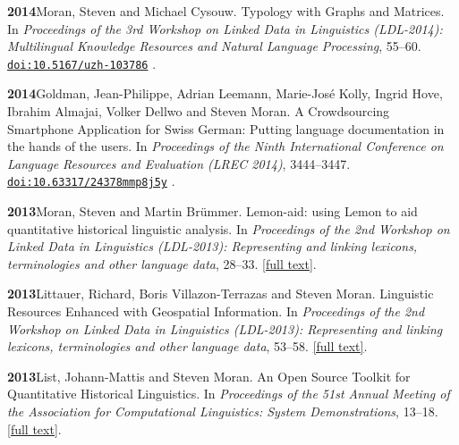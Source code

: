 \documentclass[11pt]{article}
\newcommand{\hangpara}{
 \setlength{\parindent}{0in} %
 \hangindent=0.42in %
}
\newcommand{\doi}[1]{%
  \href{https://doi.org/#1}{\nolinkurl{doi:#1}}%
}
\begin{document}
\vskip 6pt
\hangpara
{\bf 2014}\hspace{1ex}Moran, Steven and Michael Cysouw. Typology with Graphs and Matrices. In {\it Proceedings of the 3rd Workshop on Linked Data in Linguistics (LDL-2014): Multilingual Knowledge Resources and Natural Language Processing}, 55--60. \doi{10.5167/uzh-103786}.

\vskip 6pt
\hangpara
{\bf 2014}\hspace{1ex}Goldman, Jean-Philippe, Adrian Leemann, Marie-Jos{\'e} Kolly, Ingrid Hove, Ibrahim Almajai, Volker Dellwo and Steven Moran. A Crowdsourcing Smartphone Application for Swiss German: Putting language documentation in the hands of the users. In {\it Proceedings of the Ninth International Conference on Language Resources and Evaluation (LREC 2014)}, 3444--3447. \doi{10.63317/24378mmp8j5y}.

\vskip 6pt
\hangpara
{\bf 2013}\hspace{1ex}Moran, Steven and Martin Brümmer. Lemon-aid: using Lemon to aid quantitative historical linguistic analysis. In {\it Proceedings of the 2nd Workshop on Linked Data in Linguistics (LDL-2013): Representing and linking lexicons, terminologies and other language data}, 28--33. \href{https://aclanthology.org/W13-5505/}{[full text]}.

\vskip 6pt
\hangpara
{\bf 2013}\hspace{1ex}Littauer, Richard, Boris Villazon-Terrazas and Steven Moran. Linguistic Resources Enhanced with Geospatial Information. In {\it Proceedings of the 2nd Workshop on Linked Data in Linguistics (LDL-2013): Representing and linking lexicons, terminologies and other language data}, 53--58. \href{https://aclanthology.org/W13-5508/}{[full text]}.

\vskip 6pt
\hangpara
{\bf 2013}\hspace{1ex}List, Johann-Mattis and Steven Moran. An Open Source Toolkit for Quantitative Historical Linguistics. In {\it Proceedings of the 51st Annual Meeting of the Association for Computational Linguistics: System Demonstrations}, 13--18. \href{https://aclanthology.org/P13-4003/}{[full text]}.

\end{document}
